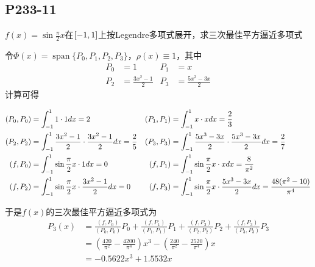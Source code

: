 \subsection{P233-11}
\renewcommand{\FX}{\sin \frac{\pi}{2} x}
\renewcommand{\LRANGE}{-1}
\renewcommand{\RRANGE}{1}
\newcommand{\PA}{P_0}
\newcommand{\PB}{P_1}
\newcommand{\PC}{P_2}
\newcommand{\PD}{P_3}
\renewcommand{\PART}[1]{\frac{(f, P_{#1})}{(P_{#1}, P_{#1})} P_{#1}}
\renewcommand{\COEFFICIENTS}[8]{
\begin{align*}
\FUNCDOT{P_0}{P_0} & = \INTRANGE{\PA \cdot \PA}{x} = #1 &
\FUNCDOT{P_1}{P_1} & = \INTRANGE{\PB \cdot \PB}{x} = #2 \\
\FUNCDOT{P_2}{P_2} & = \INTRANGE{\PC \cdot \PC}{x} = #3 &
\FUNCDOT{P_3}{P_3} & = \INTRANGE{\PD \cdot \PD}{x} = #4 \\
\FUNCDOT{f}{P_0}   & = \INTRANGE{\FX \cdot \PA}{x} = #5 &
\FUNCDOT{f}{P_1}   & = \INTRANGE{\FX \cdot \PB}{x} = #6 \\
\FUNCDOT{f}{P_2}   & = \INTRANGE{\FX \cdot \PC}{x} = #7 &
\FUNCDOT{f}{P_3}   & = \INTRANGE{\FX \cdot \PD}{x} = #8
\end{align*}
}

$f(x) = \FX$在$\RANGE$上按Legendre多项式展开，求三次最佳平方逼近多项式
\begin{SOLVE}
\renewcommand{\PA}{1}
\renewcommand{\PB}{x}
\renewcommand{\PC}{\frac{3 x^2 - 1}{2}}
\renewcommand{\PD}{\frac{5 x^3 - 3 x}{2}}
令$\Phi(x)=\operatorname{span}\{P_0, P_1, P_2, P_3\}$，$\rho(x) \equiv 1$，其中
\begin{align*}
P_0 & = \PA &
P_1 & = \PB \\
P_2 & = \PC &
P_3 & = \PD
\end{align*}
计算可得
\COEFFICIENTS{2}{\frac{2}{3}}{\frac{2}{5}}{\frac{2}{7}}{0}{\frac{8}{\pi^2}}{0}{\frac{48(\pi^2 - 10)}{\pi^4}}
于是$f(x)$的三次最佳平方逼近多项式为\begin{align*}
P_3(x) & = \PART{0} + \PART{1} + \PART{2} + \PART{3} \\
       & = (\frac{420}{\pi^2} - \frac{4200}{\pi^4}) x^3 - (\frac{240}{\pi^2} - \frac{2520}{\pi^4}) x \\
       & = -0.5622 x^3 + 1.5532 x
\end{align*}
\end{SOLVE}
